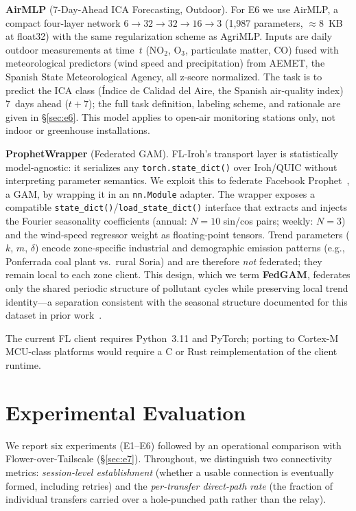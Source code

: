 ﻿\documentclass[journal]{IEEEtran}
\begin{document}
\textbf{AirMLP} (7-Day-Ahead ICA Forecasting, Outdoor). For E6 we use AirMLP, a compact four-layer network $6 \to 32 \to 32 \to 16 \to 3$ (1{,}987 parameters, $\approx$8~KB at float32) with the same regularization scheme as AgriMLP. Inputs are daily outdoor measurements at time~$t$ (NO$_2$, O$_3$, particulate matter, CO) fused with meteorological predictors (wind speed and precipitation) from AEMET, the Spanish State Meteorological Agency, all z-score normalized. The task is to predict the ICA class (\'Indice de Calidad del Aire, the Spanish air-quality index) 7~days ahead ($t{+}7$); the full task definition, labeling scheme, and rationale are given in \S\ref{sec:e6}. This model applies to open-air monitoring stations only, not indoor or greenhouse installations.

\textbf{ProphetWrapper} (Federated GAM). FL-Iroh's transport layer is statistically model-agnostic: it serializes any \texttt{torch.state\_dict()} over Iroh/QUIC without interpreting parameter semantics. We exploit this to federate Facebook Prophet~\cite{taylor2018prophet}, a GAM, by wrapping it in an \texttt{nn.Module} adapter. The wrapper exposes a compatible \texttt{state\_dict()}/\texttt{load\_state\_dict()} interface that extracts and injects the Fourier seasonality coefficients (annual: $N{=}10$ sin/cos pairs; weekly: $N{=}3$) and the wind-speed regressor weight as floating-point tensors. Trend parameters ($k$, $m$, $\delta$) encode zone-specific industrial and demographic emission patterns (e.g., Ponferrada coal plant vs.\ rural Soria) and are therefore \emph{not} federated; they remain local to each zone client. This design, which we term \textbf{FedGAM}, federates only the shared periodic structure of pollutant cycles while preserving local trend identity---a separation consistent with the seasonal structure documented for this dataset in prior work~\cite{lopezblanco2024airquality}.

The current FL client requires Python~3.11 and PyTorch; porting to Cortex-M MCU-class platforms would require a C or Rust reimplementation of the client runtime.

\section{Experimental Evaluation}
\label{sec:evaluation}

We report six experiments (E1--E6) followed by an operational comparison with Flower-over-Tailscale (\S\ref{sec:e7}). Throughout, we distinguish two connectivity metrics: \emph{session-level establishment} (whether a usable connection is eventually formed, including retries) and the \emph{per-transfer direct-path rate} (the fraction of individual transfers carried over a hole-punched path rather than the relay).
\end{document}
